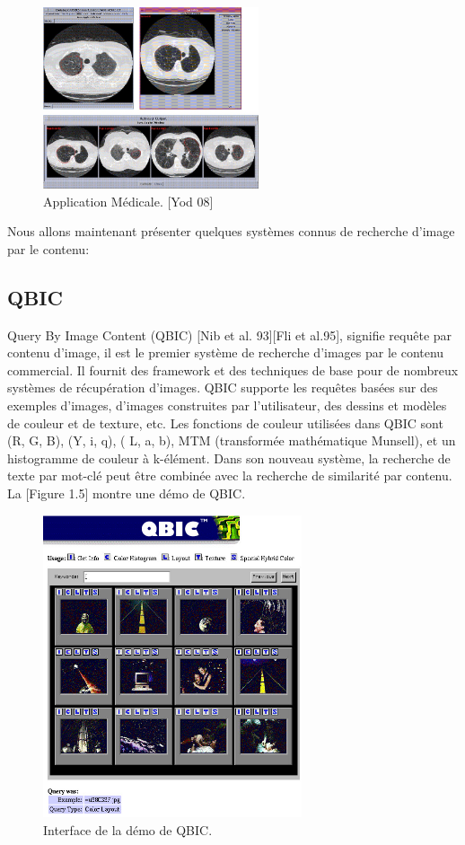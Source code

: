 \begin{figure}[H]
	\centering
		\includegraphics[width=2.5in]{Figures/cbirMedic.jpg}
	\caption[An Electron]{Application Médicale. [Yod 08]}
	\label{fig:Electron}
\end{figure}

	Nous allons maintenant présenter quelques systèmes connus de recherche d'image par le contenu:

\subsection*{QBIC}
	Query By Image Content (QBIC) [Nib et al. 93][Fli et al.95], signifie requête par contenu d'image, il est le premier système de recherche d'images par le contenu commercial. Il fournit des framework et des techniques de base pour de nombreux systèmes de récupération d'images. QBIC supporte les requêtes basées sur des exemples d'images, d'images construites par l'utilisateur, des dessins et modèles de couleur et de texture, etc. Les fonctions de couleur utilisées dans QBIC sont (R, G, B), (Y, i, q), ( L, a, b), MTM (transformée mathématique Munsell), et un histogramme de couleur à k-élément. Dans son nouveau système, la recherche de texte par mot-clé peut être combinée avec la recherche de similarité par contenu. La [Figure 1.5] montre une démo de QBIC.

\begin{figure}[H]
	\centering
		\includegraphics[width=3in]{Figures/qbic-demo.jpg}
	\caption[An Electron]{Interface de la démo de QBIC.}
	\label{fig:Electron}
\end{figure}

